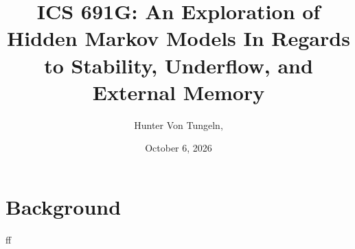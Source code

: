 \documentclass{article}
\title{ICS 691G: An Exploration of Hidden Markov Models In Regards to Stability, Underflow, and External Memory}
\author{Hunter Von Tungeln,}
\date{October 6, 2026}
\begin{document}
\maketitle
\section{Background}
ff
\end{document}
